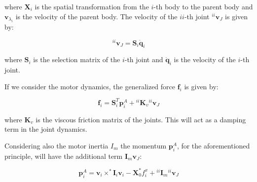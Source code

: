 where $\mathbf{X} _i$ is the spatial transformation from the $i$-th body to the parent body and $\mathbf{v} _{\lambda _i}$ is the velocity of the parent body. The velocity of the $ii$-th joint ${} ^{ii}\mathbf{v} _J$ is given by:

$$
    {} ^{ii}\mathbf{v} _J = \mathbf{S} _i \dot{\mathbf{q}} _i
$$

where $\mathbf{S} _i$ is the selection matrix of the $i$-th joint and $\dot{\mathbf{q}} _i$ is the velocity of the $i$-th joint.

If we consider the motor dynamics, the generalized force $\mathbf{f} _i$ is given by:

$$
    \mathbf{f} _i = \mathbf{S} ^T _i \mathbf{p} ^A _i + {} ^{ii} \mathbf{K} _v {} ^{ii}\mathbf{v} _J
$$

where $\mathbf{K} _v$ is the viscous friction matrix of the joints. This will act as a damping term in the joint dynamics.

Considering also the motor inertia $I _m$ the momentum $\mathbf{p} ^A _i$, for the aforementioned principle, will have the additional term $\mathbf{I} _m \mathbf{v} _J$:

$$
    \mathbf{p} ^A _i = \mathbf{v} _i \times ^* \mathbf{I} _i \mathbf{v} _i - \mathbf{X} ^* _0 f ^x _i + {} ^{ii}\mathbf{I} _m {} ^{ii}\mathbf{v} _J
$$


